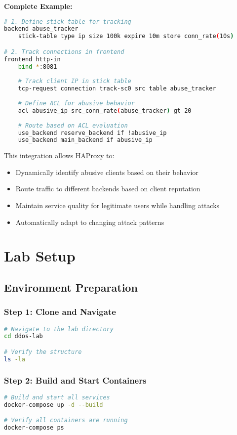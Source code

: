 \documentclass[12pt]{article}
\begin{document}
\textbf{Complete Example:}
\begin{lstlisting}[language=bash]
# 1. Define stick table for tracking
backend abuse_tracker
    stick-table type ip size 100k expire 10m store conn_rate(10s)

# 2. Track connections in frontend
frontend http-in
    bind *:8081
    
    # Track client IP in stick table
    tcp-request connection track-sc0 src table abuse_tracker
    
    # Define ACL for abusive behavior
    acl abusive_ip src_conn_rate(abuse_tracker) gt 20
    
    # Route based on ACL evaluation
    use_backend reserve_backend if !abusive_ip
    use_backend main_backend if abusive_ip
\end{lstlisting}

This integration allows HAProxy to:
\begin{itemize}
    \item Dynamically identify abusive clients based on their behavior
    \item Route traffic to different backends based on client reputation
    \item Maintain service quality for legitimate users while handling attacks
    \item Automatically adapt to changing attack patterns
\end{itemize}

\section{Lab Setup}

\subsection{Environment Preparation}

\subsubsection{Step 1: Clone and Navigate}
\begin{lstlisting}[language=bash]
# Navigate to the lab directory
cd ddos-lab

# Verify the structure
ls -la
\end{lstlisting}

\subsubsection{Step 2: Build and Start Containers}
\begin{lstlisting}[language=bash]
# Build and start all services
docker-compose up -d --build

# Verify all containers are running
docker-compose ps
\end{lstlisting}
\end{document}
